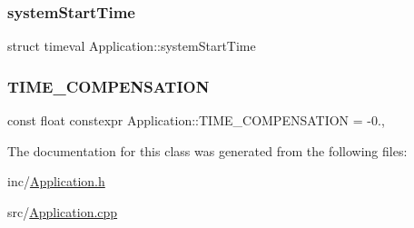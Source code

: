 \subsubsection{\texorpdfstring{system\+Start\+Time}{systemStartTime}}
{\footnotesize\ttfamily struct timeval Application\+::system\+Start\+Time\hspace{0.3cm}{\ttfamily [private]}}

\hypertarget{class_application_af90ef45c56a06dc84388443ea24f40a0}{}\label{class_application_af90ef45c56a06dc84388443ea24f40a0} 
\subsubsection{\texorpdfstring{T\+I\+M\+E\+\_\+\+C\+O\+M\+P\+E\+N\+S\+A\+T\+I\+ON}{TIME\_COMPENSATION}}
{\footnotesize\ttfamily const float constexpr Application\+::\+T\+I\+M\+E\+\_\+\+C\+O\+M\+P\+E\+N\+S\+A\+T\+I\+ON = -\/0.\hspace{0.3cm}{\ttfamily [static]}, {\ttfamily [private]}}



The documentation for this class was generated from the following files\+:\begin{DoxyCompactItemize}
\item 
inc/\hyperlink{_application_8h}{Application.\+h}\item 
src/\hyperlink{_application_8cpp}{Application.\+cpp}\end{DoxyCompactItemize}
